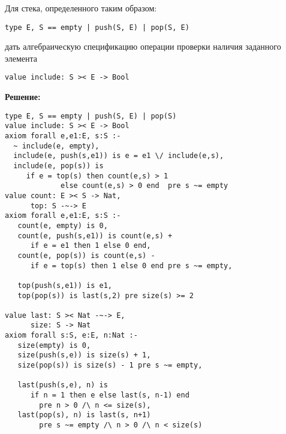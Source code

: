 
\z Для стека, определенного таким образом:
\begin{lstlisting}
type E, S == empty | push(S, E) | pop(S, E)
\end{lstlisting}
дать алгебраическую спецификацию операции проверки наличия заданного элемента
\begin{lstlisting}
value include: S >< E -> Bool
\end{lstlisting}

\textbf{Решение:}
\begin{lstlisting}
type E, S == empty | push(S, E) | pop(S)
value include: S >< E -> Bool
axiom forall e,e1:E, s:S :-
  ~ include(e, empty),
  include(e, push(s,e1)) is e = e1 \/ include(e,s),
  include(e, pop(s)) is
     if e = top(s) then count(e,s) > 1
             else count(e,s) > 0 end  pre s ~= empty
value count: E >< S -> Nat,
      top: S -~-> E
axiom forall e,e1:E, s:S :-
   count(e, empty) is 0,
   count(e, push(s,e1)) is count(e,s) +
      if e = e1 then 1 else 0 end,
   count(e, pop(s)) is count(e,s) -
      if e = top(s) then 1 else 0 end pre s ~= empty,

   top(push(s,e1)) is e1,
   top(pop(s)) is last(s,2) pre size(s) >= 2

value last: S >< Nat -~-> E,
      size: S -> Nat
axiom forall s:S, e:E, n:Nat :-
   size(empty) is 0,
   size(push(s,e)) is size(s) + 1,
   size(pop(s)) is size(s) - 1 pre s ~= empty,

   last(push(s,e), n) is
      if n = 1 then e else last(s, n-1) end
        pre n > 0 /\ n <= size(s),
   last(pop(s), n) is last(s, n+1)
        pre s ~= empty /\ n > 0 /\ n < size(s)
\end{lstlisting}


